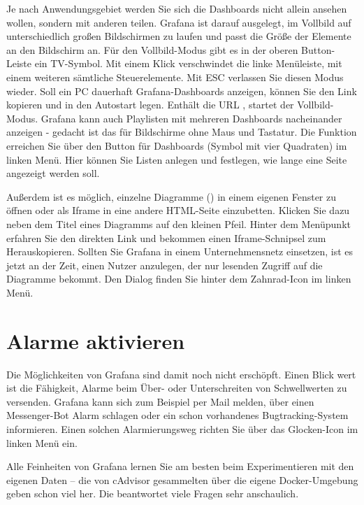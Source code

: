 Je nach Anwendungsgebiet werden Sie sich die Dashboards nicht allein ansehen wollen, sondern mit anderen teilen. Grafana ist darauf ausgelegt, im Vollbild auf unterschiedlich großen Bildschirmen zu laufen und passt die Größe der Elemente an den Bildschirm an. Für den Vollbild-Modus gibt es in der oberen Button-Leiste ein TV-Symbol. Mit einem Klick verschwindet die linke Menüleiste, mit einem weiteren sämtliche Steuerelemente. Mit ESC verlassen Sie diesen Modus wieder. Soll ein PC dauerhaft Grafana-Dashboards anzeigen, können Sie den Link kopieren und in den Autostart legen. Enthält die URL , startet der Vollbild-Modus. Grafana kann auch Playlisten mit mehreren Dashboards nacheinander anzeigen - gedacht ist das für Bildschirme ohne Maus und Tastatur. Die Funktion  erreichen Sie über den Button für Dashboards (Symbol mit vier Quadraten) im linken Menü. Hier können Sie Listen anlegen und festlegen, wie lange eine Seite angezeigt werden soll.

Außerdem ist es möglich, einzelne Diagramme () in einem eigenen Fenster zu öffnen oder als Iframe in eine andere HTML-Seite einzubetten. Klicken Sie dazu neben dem Titel eines Diagramms auf den kleinen Pfeil. Hinter dem Menüpunkt  erfahren Sie den direkten Link und bekommen einen Iframe-Schnipsel zum Herauskopieren. Sollten Sie Grafana in einem Unternehmensnetz einsetzen, ist es jetzt an der Zeit, einen Nutzer anzulegen, der nur lesenden Zugriff auf die Diagramme bekommt. Den Dialog finden Sie hinter dem Zahnrad-Icon im linken Menü.

\section{Alarme aktivieren}

Die Möglichkeiten von Grafana sind damit noch nicht erschöpft. Einen Blick wert ist die Fähigkeit, Alarme beim Über- oder Unterschreiten von Schwellwerten zu versenden. Grafana kann sich zum Beispiel per Mail melden, über einen Messenger-Bot Alarm schlagen oder ein schon vorhandenes Bugtracking-System informieren. Einen solchen Alarmierungsweg richten Sie über das Glocken-Icon im linken Menü ein.

Alle Feinheiten von Grafana lernen Sie am besten beim Experimentieren mit den eigenen Daten – die von cAdvisor gesammelten über die eigene Docker-Umgebung geben schon viel her. Die  beantwortet viele Fragen sehr anschaulich.

